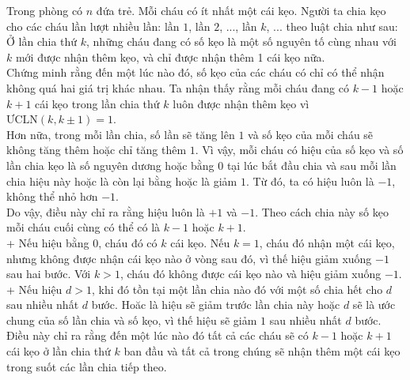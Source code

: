 \begin{ex}%
	Trong phòng có $n$ đứa trẻ. Mỗi cháu có ít nhất một cái kẹo. Người ta chia kẹo cho các cháu lần lượt nhiều lần: lần $1$, lần $2$, ..., lần $k$, ...  theo luật chia  như sau:
	Ở lần chia thứ $k$, những cháu đang có số kẹo là một số nguyên tố cùng nhau với $k$ mới được nhận thêm kẹo, và chỉ được nhận thêm 1 cái kẹo nữa. \\
	Chứng minh rằng đến một lúc nào đó, số kẹo của các cháu có chỉ có thể nhận không quá hai giá trị khác nhau.
	\loigiai
	{
		Ta nhận thấy rằng mỗi cháu đang có $k-1$ hoặc $k+1$ cái kẹo trong lần chia thứ $k$ luôn được nhận thêm kẹo vì  $\mbox{ƯCLN}(k,k\pm1)=1$.\\
		Hơn nữa, trong mỗi lần chia, số lần sẽ tăng lên $1$ và số kẹo của mỗi cháu sẽ không tăng thêm hoặc chỉ tăng thêm $1$. Vì vậy, mỗi cháu có hiệu của số kẹo và số lần chia kẹo là số nguyên dương hoặc bằng 0 tại lúc bắt đầu chia và sau mỗi lần chia hiệu này hoặc là còn lại bằng hoặc là giảm $1$. Từ đó, ta có hiệu luôn là $-1$, không thể nhỏ hơn $-1$.\\
		Do vậy, điều này chỉ ra rằng hiệu luôn là $+1$ và $-1$. Theo cách chia này số kẹo  mỗi  cháu cuối cùng có thể có là $k-1$ hoặc $k+1$.\\
		+ Nếu hiệu bằng $0$, cháu đó có $k$ cái kẹo. Nếu $k=1$, cháu đó nhận một cái kẹo, nhưng không được nhận cái kẹo nào ở vòng sau đó, vì thế hiệu giảm xuống $-1$ sau hai bước. Với $k>1$, cháu đó không được cái kẹo nào và hiệu giảm xuống $-1$.\\
		+ Nếu hiệu $d>1$, khi đó tồn tại một lần chia  nào đó  với một số chia hết cho $d$ sau nhiều nhất $d$ bước. Hoăc là hiệu sẽ giảm trước lần chia này hoặc $d$ sẽ là ước chung của số lần chia và số kẹo, vì thế hiệu sẽ giảm $1$ sau nhiều nhất $d$ bước.\\
		Điều này chỉ ra rằng đến một lúc nào đó tất cả các cháu sẽ có $k-1$ hoặc $k+1$ cái kẹo ở lần chia thứ $k$ ban đầu và tất cả trong chúng sẽ nhận thêm một cái kẹo trong suốt các lần chia tiếp theo. 
	}
\end{ex}

